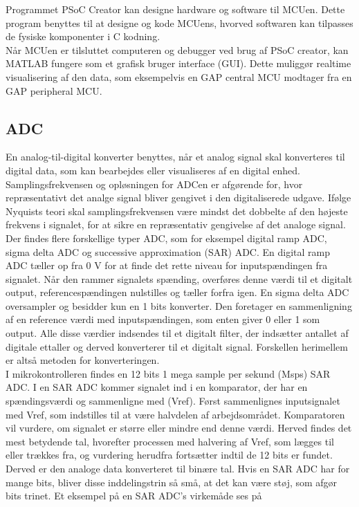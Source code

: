 Programmet PSoC Creator kan designe hardware og software til MCUen. Dette program benyttes til at designe og kode MCUens, hvorved softwaren kan tilpasses de fysiske komponenter i C kodning. \citep{Semiconductor2016} \\
Når MCUen er tilsluttet computeren og debugger ved brug af PSoC creator, kan MATLAB fungere som et grafisk bruger interface (GUI). Dette muliggør realtime visualisering af den data, som eksempelvis en GAP central MCU modtager fra en GAP peripheral MCU.\citep{Semiconductor2016,Sparkfun2016}

\subsection{ADC}
En analog-til-digital konverter benyttes, når et analog signal skal konverteres til digital data, som kan bearbejdes eller visualiseres af en digital enhed. Samplingsfrekvensen og opløsningen for ADCen er afgørende for, hvor repræsentativt det analge signal bliver gengivet i den digitaliserede udgave. Ifølge Nyquists teori skal samplingsfrekvensen være mindst det dobbelte af den højeste frekvens i signalet, for at sikre en repræsentativ gengivelse af det analoge signal. Der findes flere forskellige typer ADC, som for eksempel digital ramp ADC, sigma delta ADC og successive approximation (SAR) ADC. En digital ramp ADC tæller op fra 0 V for at finde det rette niveau for inputspændingen fra signalet. Når den rammer signalets spænding, overføres denne værdi til et digitalt output, referencespændingen nulstilles og tæller forfra igen. En sigma delta ADC oversampler og besidder kun en 1 bits konverter. Den foretager en sammenligning af en reference værdi med inputspændingen, som enten giver 0 eller 1 som output. Alle disse værdier indsendes til et digitalt filter, der indsætter antallet af digitale ettaller og derved konverterer til et digitalt signal. Forskellen herimellem er altså metoden for konverteringen. \citep{Moore2004,Sheingold2014} \\
I mikrokontrolleren findes en 12 bits 1 mega sample per sekund (Msps) SAR ADC. I en SAR ADC kommer signalet ind i en komparator, der har en spændingsværdi og sammenligne med (Vref). Først sammenlignes inputsignalet med Vref, som indstilles til at være halvdelen af arbejdsområdet. Komparatoren vil vurdere, om signalet er større eller mindre end denne værdi. Herved findes det mest betydende tal, hvorefter processen med halvering af Vref, som lægges til eller trækkes fra, og vurdering herudfra fortsætter indtil de 12 bits er fundet. Derved er den analoge data konverteret til binære tal. Hvis en SAR ADC har for mange bits, bliver disse inddelingstrin så små, at det kan være støj, som afgør bits trinet. \citep{Moore2004,Sheingold2014} Et eksempel på en SAR ADC's virkemåde ses på 
